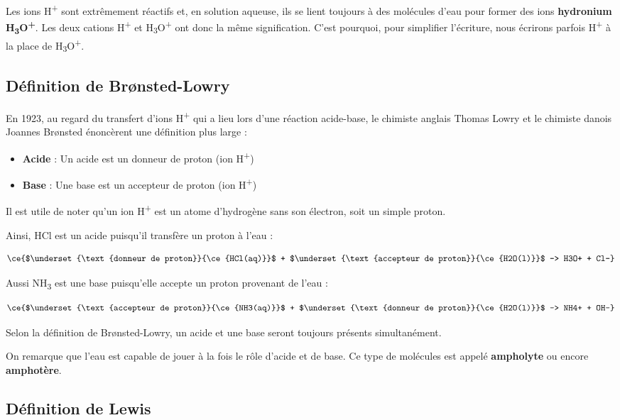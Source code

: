 \documentclass[
  11pt,
  a4paper,
  openany]{book}
\providecommand{\tightlist}{%
  \setlength{\itemsep}{0pt}\setlength{\parskip}{0pt}}
\begin{document}
Les ions H\textsuperscript{+} sont extrêmement réactifs et, en solution aqueuse, ils se lient toujours à des molécules d'eau pour former des ions \textbf{hydronium H\textsubscript{3}O\textsuperscript{+}}. Les deux cations H\textsuperscript{+} et H\textsubscript{3}O\textsuperscript{+} ont donc la même signification. C'est pourquoi, pour simplifier l'écriture, nous écrirons parfois H\textsuperscript{+} à la place de H\textsubscript{3}O\textsuperscript{+}.

\clearpage

\subsection{Définition de Brønsted-Lowry}\label{duxe9finition-de-bruxf8nsted-lowry}

En 1923, au regard du transfert d'ions H\textsuperscript{+} qui a lieu lors d'une réaction acide-base, le chimiste anglais Thomas Lowry et le chimiste danois Joannes Brønsted énoncèrent une définition plus large :

\begin{itemize}
\tightlist
\item
  \textbf{Acide} : Un acide est un donneur de proton (ion H\textsuperscript{+})
\item
  \textbf{Base} : Une base est un accepteur de proton (ion H\textsuperscript{+})
\end{itemize}

Il est utile de noter qu'un ion H\textsuperscript{+} est un atome d'hydrogène sans son électron, soit un simple proton.

Ainsi, HCl est un acide puisqu'il transfère un proton à l'eau :

\[
\ce{$\underset{\text{donneur de proton}}{\ce{HCl(aq)}}$ + $\underset{\text{accepteur de proton}}{\ce{H2O(l)}}$ -> H3O+ + Cl-}
\]

Aussi NH\textsubscript{3} est une base puisqu'elle accepte un proton provenant de l'eau :

\[
\ce{$\underset{\text{accepteur de proton}}{\ce{NH3(aq)}}$ + $\underset{\text{donneur de proton}}{\ce{H2O(l)}}$ -> NH4+ + OH-}
\]

Selon la définition de Brønsted-Lowry, un acide et une base seront toujours présents simultanément.

On remarque que l'eau est capable de jouer à la fois le rôle d'acide et de base. Ce type de molécules est appelé \textbf{ampholyte} ou encore \textbf{amphotère}.

\subsection{Définition de Lewis}\label{duxe9finition-de-lewis}
\end{document}
